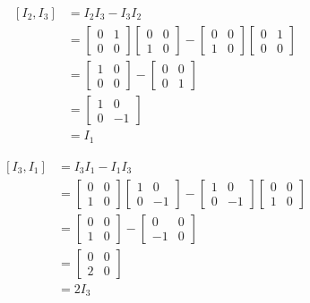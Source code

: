 \begin{align}
\left[I_2,I_3\right]
&=I_2I_3-I_3I_2 \\
&=\begin{bmatrix}
0 &1 \\
0 &0
\end{bmatrix}
\begin{bmatrix}
0 &0 \\
1 &0
\end{bmatrix}
-\begin{bmatrix}
0 &0 \\
1 &0
\end{bmatrix}
\begin{bmatrix}
0 &1 \\
0 &0
\end{bmatrix} \\
&=\begin{bmatrix}
1 &0 \\
0 &0
\end{bmatrix}
-\begin{bmatrix}
0 &0 \\
0 &1
\end{bmatrix} \\
&=\begin{bmatrix}
1 &0 \\
0 &-1
\end{bmatrix} \\
&=I_1
\end{align}

\begin{align}
\left[I_3,I_1\right]
&=I_3I_1-I_1I_3 \\
&=\begin{bmatrix}
0 &0 \\
1 &0
\end{bmatrix}
\begin{bmatrix}
1 &0 \\
0 &-1
\end{bmatrix}
-\begin{bmatrix}
1 &0 \\
0 &-1
\end{bmatrix}
\begin{bmatrix}
0 &0 \\
1 &0
\end{bmatrix} \\
&=\begin{bmatrix}
0 &0 \\
1 &0
\end{bmatrix}
-\begin{bmatrix}
0 &0 \\
-1 &0
\end{bmatrix} \\
&=\begin{bmatrix}
0 &0 \\
2 &0
\end{bmatrix} \\
&=2I_3
\end{align}

